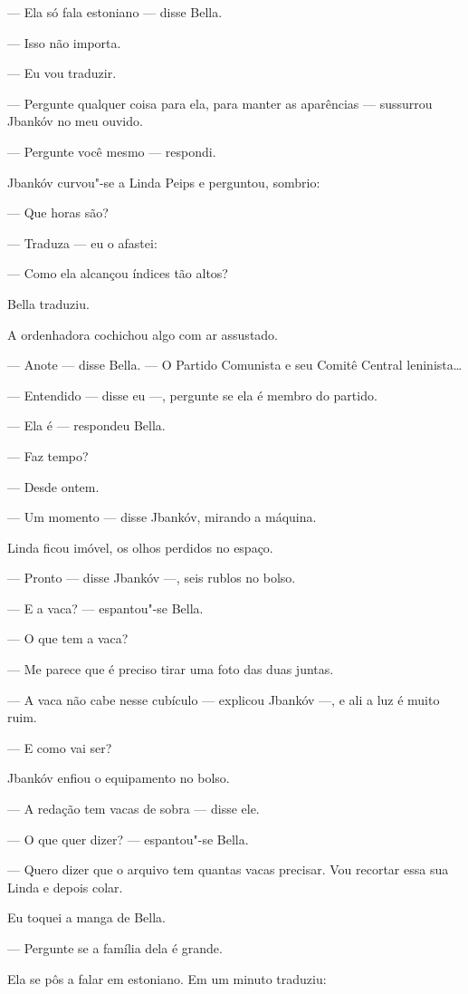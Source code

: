 --- Ela só fala estoniano --- disse Bella.

--- Isso não importa.

--- Eu vou traduzir.

--- Pergunte qualquer coisa para ela, para manter as aparências
--- sussurrou Jbankóv no meu ouvido.

--- Pergunte você mesmo --- respondi.

Jbankóv curvou"-se a Linda Peips e perguntou, sombrio:

--- Que horas são?

--- Traduza --- eu o afastei:

--- Como ela alcançou índices tão altos?

Bella traduziu.

A ordenhadora cochichou algo com ar assustado.

--- Anote --- disse Bella. --- O Partido Comunista
e seu Comitê Central leninista\ldots{}

--- Entendido --- disse eu ---, pergunte se ela é
membro do partido.

--- Ela é --- respondeu Bella.

--- Faz tempo?

--- Desde ontem.

--- Um momento --- disse Jbankóv, mirando a máquina.

Linda ficou imóvel, os olhos perdidos no espaço.

--- Pronto --- disse Jbankóv ---, seis rublos no
bolso.

--- E a vaca? --- espantou"-se Bella.

--- O que tem a vaca?

--- Me parece que é preciso tirar uma foto das duas juntas.

--- A vaca não cabe nesse cubículo --- explicou Jbankóv
---, e ali a luz é muito ruim.

--- E como vai ser?

Jbankóv enfiou o equipamento no bolso.

--- A redação tem vacas de sobra --- disse ele.

--- O que quer dizer? --- espantou"-se Bella.

--- Quero dizer que o arquivo tem quantas vacas precisar. Vou
recortar essa sua Linda e depois colar.

Eu toquei a manga de Bella.

--- Pergunte se a família dela é grande.

Ela se pôs a falar em estoniano. Em um minuto traduziu:

